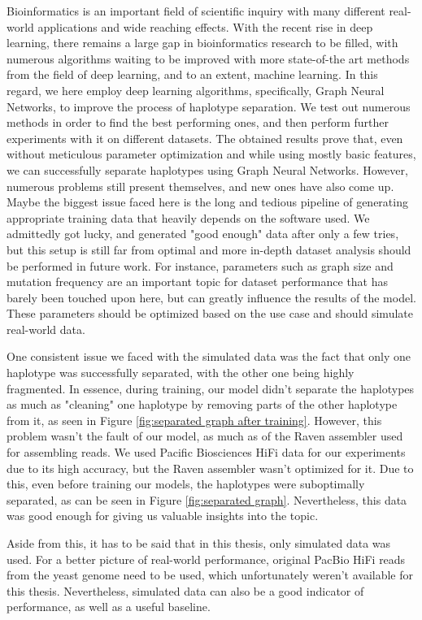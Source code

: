 \documentclass[times, utf8, diplomski, english]{fer_eng}
\begin{document}
Bioinformatics is an important field of scientific inquiry with many different real-world applications and wide reaching effects. With the recent rise in deep learning, there remains a large gap in bioinformatics research to be filled, with numerous algorithms waiting to be improved with more state-of-the art methods from the field of deep learning, and to an extent, machine learning. In this regard, we here employ deep learning algorithms, specifically, Graph Neural Networks, to improve the process of haplotype separation. We test out numerous methods in order to find the best performing ones, and then perform further experiments with it on different datasets. The obtained results prove that, even without meticulous parameter optimization and while using mostly basic features, we can successfully separate haplotypes using Graph Neural Networks. However, numerous problems still present themselves, and new ones have also come up. Maybe the biggest issue faced here is the long and tedious pipeline of generating appropriate training data that heavily depends on the software used. We admittedly got lucky, and generated "good enough" data after only a few tries, but this setup is still far from optimal and more in-depth dataset analysis should be performed in future work. For instance, parameters such as graph size and mutation frequency are an important topic for dataset performance that has barely been touched upon here, but can greatly influence the results of the model. These parameters should be optimized based on the use case and should simulate real-world data.

One consistent issue we faced with the simulated data was the fact that only one haplotype was successfully separated, with the other one being highly fragmented. In essence, during training, our model didn't separate the haplotypes as much as "cleaning" one haplotype by removing parts of the other haplotype from it, as seen in Figure \ref{fig:separated graph after training}. However, this problem wasn't the fault of our model, as much as of the Raven assembler used for assembling reads. We used Pacific Biosciences HiFi data for our experiments due to its high accuracy, but the Raven assembler wasn't optimized for it. Due to this, even before training our models, the haplotypes were suboptimally separated, as can be seen in Figure \ref{fig:separated graph}. Nevertheless, this data was good enough for giving us valuable insights into the topic.

Aside from this, it has to be said that in this thesis, only simulated data was used. For a better picture of real-world performance, original PacBio HiFi reads from the yeast genome need to be used, which unfortunately weren't available for this thesis. Nevertheless, simulated data can also be a good indicator of performance, as well as a useful baseline.
\end{document}
